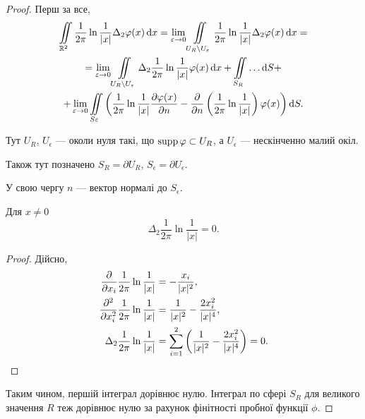 \begin{proof}
	Перш за все,
	\begin{multline}
		\displaystyle\iint\limits_{\mathbb{R}^2} \frac{1}{2 \pi} \ln \frac{1}{|x|} \Delta_2 \varphi(x) \mathop{}\!\mathrm{d} x = \displaystyle\lim\limits_{\varepsilon \to 0} \displaystyle\iint\limits_{U_R \setminus U_\varepsilon} \frac{1}{2 \pi} \ln \frac{1}{|x|} \Delta_2 \varphi(x) \mathop{}\!\mathrm{d} x = \\
		= \displaystyle\lim\limits_{\varepsilon \to 0} \displaystyle\iint\limits_{U_R \setminus U_\varepsilon} \Delta_2 \frac{1}{2 \pi} \ln \frac{1}{|x|} \varphi(x) \mathop{}\!\mathrm{d} x + \displaystyle\iint\limits_{S_R} \ldots \mathop{}\!\mathrm{d} S + \\
		+ \displaystyle\lim\limits_{\varepsilon \to 0} \displaystyle\iint\limits_{S \varepsilon} \left( \frac{1}{2 \pi} \ln \frac{1}{|x|} \frac{\partial \varphi(x)}{\partial n} - \frac{\partial}{\partial n} \left( \frac{1}{2 \pi} \ln \frac{1}{|x|} \right) \varphi(x) \right) \mathop{}\!\mathrm{d} S.
	\end{multline}

	\begin{remark}
		Тут $U_R$, $U_\epsilon$ --- околи нуля такі, що $\operatorname{supp} \varphi \subset U_R$, а $U_\epsilon$ --- нескінченно малий окіл. \medskip

		Також тут позначено $S_R = \partial U_R$, $S_\epsilon = \partial U_\epsilon$. \medskip
		
		У свою чергу $n$ --- вектор нормалі до $S_\epsilon$.
	\end{remark}
 
	\begin{proposition}
		Для $x \ne 0$
		\begin{equation}
			\Delta_2 \frac{1}{2 \pi} \ln \frac{1}{|x|} = 0.
		\end{equation}
	\end{proposition}

	\begin{proof}
		Дійсно,
		\begin{align}
			\frac{\partial}{\partial x_i} \frac{1}{2 \pi} \ln \frac{1}{|x|} &= - \frac{x_i}{|x|^2}, \\
			\frac{\partial^2}{\partial x_i^2} \frac{1}{2 \pi} \ln \frac{1}{|x|} &= \frac{1}{|x|^2} - \frac{2 x_i^2}{|x|^4}, \\
			\Delta_2 \frac{1}{2 \pi} \ln \frac{1}{|x|} &= \displaystyle\sum\limits_{i = 1}^2 \left(\frac{1}{|x|^2} - \frac{2 x_i^2}{|x|^4}\right) = 0.
		\end{align}
	\end{proof}

	Таким чином, першій інтеграл дорівнює нулю. Інтеграл по сфері $S_R$ для великого значення $R$ теж дорівнює нулю за рахунок фінітності пробної функції $\phi$.


\end{proof}
